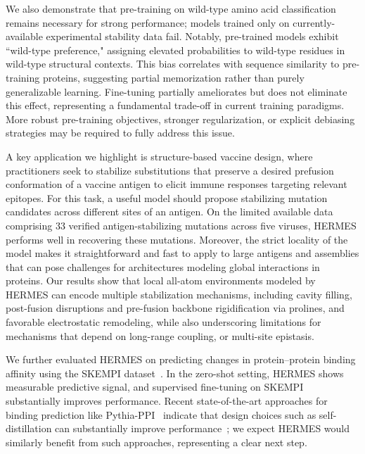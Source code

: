 We also demonstrate that pre-training on wild-type amino acid classification remains necessary for
strong performance; models trained only on currently-available experimental stability data fail.
Notably, pre-trained models exhibit ``wild-type preference," assigning elevated probabilities to
wild-type residues in wild-type structural contexts. This bias correlates with sequence similarity
to pre-training proteins, suggesting partial memorization rather than purely generalizable learning.
Fine-tuning partially ameliorates but does not eliminate this effect, representing a fundamental
trade-off in current training paradigms. More robust pre-training objectives, stronger
regularization, or explicit debiasing strategies may be required to fully address this issue.

A key application we highlight is structure-based vaccine design, where practitioners seek to
stabilize substitutions that preserve a desired prefusion conformation of a vaccine antigen to
elicit immune responses targeting relevant epitopes. For this task, a useful model should propose
stabilizing mutation candidates across different sites of an antigen.
On the limited available data comprising 33 verified antigen-stabilizing mutations across five viruses,
HERMES performs well in recovering these mutations.
Moreover, the strict locality of the model makes it straightforward and
fast to apply to large antigens and assemblies that can pose challenges for architectures modeling
global interactions in proteins.
Our results show that local all-atom environments modeled by HERMES
can encode multiple stabilization mechanisms, including cavity filling, post-fusion disruptions and
pre-fusion backbone rigidification via prolines, and favorable electrostatic remodeling,
while also underscoring limitations for mechanisms
that depend on long-range coupling, or multi-site epistasis.


We further evaluated HERMES on predicting changes in protein--protein binding affinity using the
SKEMPI dataset~\citep{jankauskaite_skempi_2019}. In the zero-shot setting, HERMES shows measurable
predictive signal, and supervised fine-tuning on SKEMPI {substantially} improves performance.
Recent state-of-the-art approaches for binding prediction like Pythia-PPI~\citep{tao_reliable_2025}
indicate that design choices such as self-distillation can substantially improve
performance~\citep{tao_reliable_2025}; we expect HERMES would similarly benefit from such
approaches, representing a clear next step.

